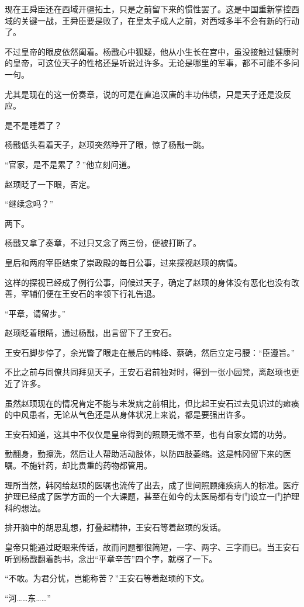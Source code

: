 现在王舜臣还在西域开疆拓土，只是之前留下来的惯性罢了。这是中国重新掌控西域的关键一战，王舜臣要是败了，在皇太子成人之前，对西域多半不会有新的行动了。

不过皇帝的眼皮依然阖着。杨戬心中狐疑，他从小生长在宫中，虽没接触过健康时的皇帝，可这位天子的性格还是听说过许多。无论是哪里的军事，都不可能不多问一句。

尤其是现在的这一份奏章，说的可是在直追汉唐的丰功伟绩，只是天子还是没反应。

是不是睡着了？

杨戬低头看着天子，赵顼突然睁开了眼，惊了杨戬一跳。

“官家，是不是累了？”他立刻问道。

赵顼眨了一下眼，否定。

“继续念吗？”

两下。

杨戬又拿了奏章，不过只又念了两三份，便被打断了。

皇后和两府宰臣结束了崇政殿的每日公事，过来探视赵顼的病情。

这样的探视已经成了例行公事，问候过天子，确定了赵顼的身体没有恶化也没有改善，宰辅们便在王安石的率领下行礼告退。

“平章，请留步。”

赵顼眨着眼睛，通过杨戬，出言留下了王安石。

王安石脚步停了，余光瞥了眼走在最后的韩绛、蔡确，然后立定弓腰：“臣遵旨。”

不比之前与同僚共同拜见天子，王安石君前独对时，得到一张小园凳，离赵顼也更近了许多。

虽然赵顼现在的情况肯定不能与未发病之前相比，但比起王安石过去见识过的瘫痪的中风患者，无论从气色还是从身体状况上来说，都是要强出许多。

王安石知道，这其中不仅仅是皇帝得到的照顾无微不至，也有自家女婿的功劳。

勤翻身，勤擦洗，然后让人帮助活动肢体，以防四肢萎缩。这是韩冈留下来的医嘱。不施针药，却比贵重的药物都管用。

理所当然，韩冈给赵顼的医嘱也流传了出去，成了世间照顾瘫痪病人的标准。医疗护理已经成了医学方面的一个大课题，甚至在如今的太医局都有专门设立一门护理科的想法。

排开脑中的胡思乱想，打叠起精神，王安石等着赵顼的发话。

皇帝只能通过眨眼来传话，故而问题都很简短，一字、两字、三字而已。当王安石听到杨戬翻着韵书，念出“平章辛苦”四个字，就楞了一下。

“不敢。为君分忧，岂能称苦？”王安石等着赵顼的下文。

“河……东……”

